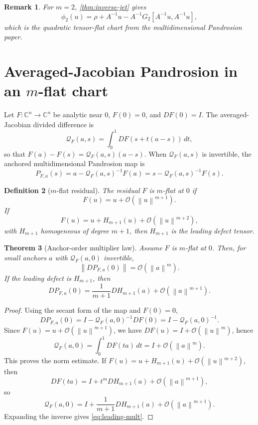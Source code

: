 \documentclass[11pt]{article}
\newtheorem{definition}{Definition}[section]
\newtheorem{theorem}[definition]{Theorem}
\newtheorem{remark}[definition]{Remark}
\newcommand{\C}{\mathbb C}
\newcommand{\Oterm}{\mathcal O}
\newcommand{\Q}{\mathcal Q}
\newcommand{\norm}[1]{\left\lVert #1\right\rVert}
\begin{document}
\begin{remark}
For \(m=2\), \cref{thm:inverse-jet} gives
\[
        \phi_2(u)=\rho+A^{-1}u-A^{-1}G_2[A^{-1}u,A^{-1}u],
\]
which is the quadratic tensor-flat chart from the multidimensional Pandrosion paper.
\end{remark}

\section{Averaged-Jacobian Pandrosion in an \(m\)-flat chart}

Let \(F:\C^n\to\C^n\) be analytic near \(0\), \(F(0)=0\), and \(DF(0)=I\). The averaged-Jacobian divided difference is
\[
        \Q_F(a,s)=\int_0^1 DF(s+t(a-s))\,dt,
\]
so that \(F(a)-F(s)=\Q_F(a,s)(a-s)\). When \(\Q_F(a,s)\) is invertible, the anchored multidimensional Pandrosion map is
\[
        P_{F,a}(s)=a-\Q_F(a,s)^{-1}F(a)
        =
        s-\Q_F(a,s)^{-1}F(s).
\]

\begin{definition}[\(m\)-flat residual]
The residual \(F\) is \(m\)-flat at \(0\) if
\[
        F(u)=u+\Oterm(\norm{u}^{m+1}).
\]
If
\[
        F(u)=u+H_{m+1}(u)+\Oterm(\norm{u}^{m+2}),
\]
with \(H_{m+1}\) homogeneous of degree \(m+1\), then \(H_{m+1}\) is the leading defect tensor.
\end{definition}

\begin{theorem}[Anchor-order multiplier law]\label{thm:mult-law}
Assume \(F\) is \(m\)-flat at \(0\). Then, for small anchors \(a\) with \(\Q_F(a,0)\) invertible,
\[
        \norm{D P_{F,a}(0)}=\Oterm(\norm{a}^{m}).
\]
If the leading defect is \(H_{m+1}\), then
\begin{equation}\label{eq:leading-mult}
        D P_{F,a}(0)
        =
        \frac{1}{m+1}D H_{m+1}(a)+\Oterm(\norm{a}^{m+1}).
\end{equation}
\end{theorem}

\begin{proof}
Using the secant form of the map and \(F(0)=0\),
\[
        D P_{F,a}(0)=I-\Q_F(a,0)^{-1}DF(0)=I-\Q_F(a,0)^{-1}.
\]
Since \(F(u)=u+\Oterm(\norm{u}^{m+1})\), we have \(DF(u)=I+\Oterm(\norm{u}^{m})\), hence
\[
        \Q_F(a,0)=\int_0^1 DF(ta)\,dt=I+\Oterm(\norm{a}^{m}).
\]
This proves the norm estimate. If \(F(u)=u+H_{m+1}(u)+\Oterm(\norm{u}^{m+2})\), then
\[
        DF(ta)=I+t^m DH_{m+1}(a)+\Oterm(\norm{a}^{m+1}),
\]
so
\[
        \Q_F(a,0)=I+\frac{1}{m+1}DH_{m+1}(a)+\Oterm(\norm{a}^{m+1}).
\]
Expanding the inverse gives \eqref{eq:leading-mult}.
\end{proof}
\end{document}

